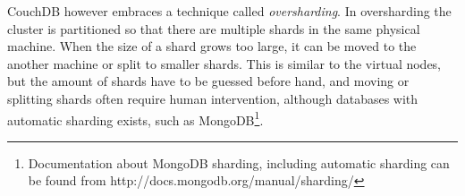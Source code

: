 CouchDB however embraces a technique called \emph{oversharding}. In oversharding
the cluster is partitioned so that there are multiple shards in the same
physical machine. When the size of a shard grows too large, it can be moved to
the another machine or split to smaller shards. This is similar to the virtual
nodes, but the amount of shards have to be guessed before hand, and moving or
splitting shards often require human intervention, although databases with
automatic sharding exists, such as MongoDB\@\footnote{Documentation about
MongoDB sharding, including automatic sharding can be found from
http://docs.mongodb.org/manual/sharding/}.
